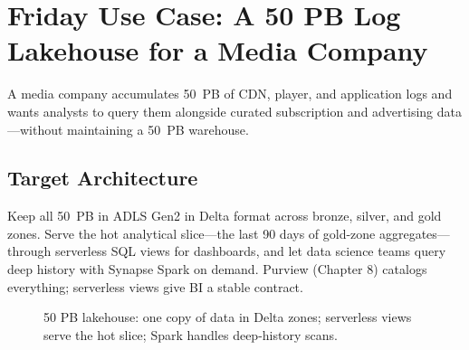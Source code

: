 \section{Friday Use Case: A 50 PB Log Lakehouse for a Media Company}
A media company accumulates 50~PB of CDN, player, and application logs and wants analysts to query them alongside curated subscription and advertising data---without maintaining a 50~PB warehouse.

\subsection{Target Architecture}
Keep all 50~PB in ADLS Gen2 in Delta format across bronze, silver, and gold zones. Serve the hot analytical slice---the last 90 days of gold-zone aggregates---through serverless SQL views for dashboards, and let data science teams query deep history with Synapse Spark on demand. Purview (Chapter 8) catalogs everything; serverless views give BI a stable contract.

\begin{figure}[H]
    \centering
    \caption{50 PB lakehouse: one copy of data in Delta zones; serverless views serve the hot slice; Spark handles deep-history scans.}
    \label{fig:ch7-media-lakehouse}
\end{figure}

